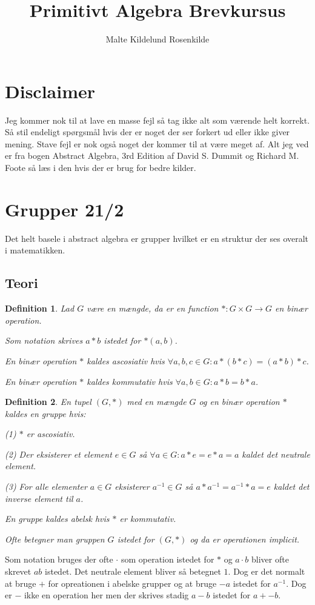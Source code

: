 \documentclass{article}
\title{Primitivt Algebra Brevkursus}
\author{Malte Kildelund Rosenkilde}
\newcommand{\inv}{^{-1}}
\newcommand{\too}{\rightarrow}
\newtheorem{defi}{Definition}
\begin{document}
	\maketitle
	\newpage

	\section*{Disclaimer}
		Jeg kommer nok til at lave en masse fejl så tag ikke alt som værende helt
		korrekt. Så stil endeligt spørgsmål hvis der er noget der ser forkert ud
		eller ikke giver mening.
		Stave fejl er nok også noget der kommer til at være meget af.
		Alt jeg ved er fra bogen
		Abstract Algebra, 3rd Edition af David S. Dummit og Richard M. Foote
		så læs i den hvis der er brug for bedre kilder.
	\section*{Grupper 21/2}
		Det helt basele i abstract algebra er grupper hvilket er en struktur der
		ses overalt i matematikken.
		\subsection*{Teori}
		\begin{defi}
			Lad $G$ være en mængde, da er en function $*: G \times G \too G$
			en binær operation.

			Som notation skrives $a*b$ istedet for $*(a,b)$.

			En binær operation $*$ kaldes ascosiativ hvis
			$\forall a,b,c \in G: a*(b*c) = (a*b)*c$.

			En binær operation $*$ kaldes kommutativ hvis
			$\forall a,b \in G: a*b = b*a$.
		\end{defi}
		\begin{defi}
			En tupel $(G,*)$ med en mængde $G$ og en binær operation $*$ kaldes
			en gruppe hvis:

			(1) $*$ er ascosiativ.

			(2) Der eksisterer et element $e \in G$ så $\forall a \in G: a*e=e*a=a$
			kaldet det neutrale element.

			(3) For alle elementer $a \in G$ eksisterer $a\inv \in G$ så
			$a*a\inv = a\inv*a = e$ kaldet det inverse element til $a$.

			En gruppe kaldes abelsk hvis $*$ er kommutativ.

			Ofte betegner man gruppen $G$ istedet for $(G,*)$ og
			da er operationen implicit.
		\end{defi}
		Som notation bruges der ofte $\cdot$ som operation istedet for $*$ og
		$a\cdot b$ bliver ofte skrevet $ab$ istedet. Det neutrale element bliver så
		betegnet $1$. Dog er det normalt at bruge
		$+$ for opreationen i abelske grupper og at bruge $-a$ istedet for $a\inv$.
		Dog er $-$ ikke en operation her men der skrives stadig $a-b$ istedet for $a+-b$.
\end{document}
